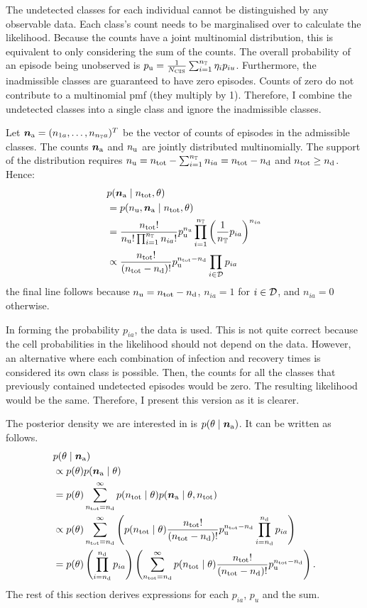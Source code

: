 \documentclass[thesis.tex]{subfiles}
\begin{document}
The undetected classes for each individual cannot be distinguished by any observable data.
Each class's count needs to be marginalised over to calculate the likelihood.
Because the counts have a joint multinomial distribution, this is equivalent to only considering the sum of the counts.
The overall probability of an episode being unobserved is $p_\text{u} = \frac{1}{N_\text{CIS}} \sum_{i=1}^{n_{\mathbb{T}}} \eta_i p_{iu}$.
Furthermore, the inadmissible classes are guaranteed to have zero episodes.
Counts of zero do not contribute to a multinomial pmf (they multiply by 1).
Therefore, I combine the undetected classes into a single class and ignore the inadmissible classes.

Let $\bm{n_\text{a}} = (n_{1a}, \dots, n_{n_{\mathbb{T}} a})^T$ be the vector of counts of episodes in the admissible classes.
The counts $\bm{n_\text{a}}$ and $n_\text{u}$ are jointly distributed multinomially.
The support of the distribution requires $n_\text{u} = n_\text{tot} - \sum_{i=1}^{n_{\mathbb{T}}} n_{ia} = n_\text{tot} - n_\text{d}$ and $n_\text{tot} \geq n_\text{d}$.
Hence:
\begin{align}
&p(\bm{n_\text{a}} \mid n_\text{tot}, \theta) \\
&= p(n_\text{u}, \bm{n_\text{a}}\mid n_\text{tot}, \theta) \\
&= \frac{n_\text{tot}!}{n_\text{u}! \prod_{i=1}^{n_{\mathbb{T}}} n_{ia}!}  p_\text{u}^{n_\text{u}}\prod_{i=1}^{n_{\mathbb{T}}} \left(\frac{1}{n_{\mathbb{T}}}p_{ia}\right)^{n_{ia}} \\
&\propto \frac{n_\text{tot}!}{(n_\text{tot} - n_\text{d})!} p_\text{u}^{n_\text{tot} - n_\text{d}} \prod_{i \in \mathcal{D}} p_{ia} \label{perf-test:eq:augmented-likelihood}
\end{align}
the final line follows because $n_\text{u} = n_\text{tot} - n_\text{d}$, $n_{ia} = 1$ for $i \in \mathcal{D}$, and $n_{ia} = 0$ otherwise.

In forming the probability $p_{ia}$, the data is used.
This is not quite correct because the cell probabilities in the likelihood should not depend on the data.
However, an alternative where each combination of infection and recovery times is considered its own class is possible.
Then, the counts for all the classes that previously contained undetected episodes would be zero.
The resulting likelihood would be the same.
Therefore, I present this version as it is clearer.

The posterior density we are interested in is $p(\theta \mid \bm{n_\text{a}})$.
It can be written as follows.
\begin{align}
&p(\theta \mid \bm{n_\text{a}}) \\
&\propto p(\theta) p(\bm{n_\text{a}} \mid \theta) \\
&= p(\theta) \sum_{n_\text{tot}=n_\text{d}}^\infty p(n_\text{tot} \mid \theta) p(\bm{n_\text{a}} \mid \theta, n_\text{tot}) \\
&\propto p(\theta) \sum_{n_\text{tot}=n_\text{d}}^\infty \left( p(n_\text{tot} \mid \theta) \frac{n_\text{tot}!}{(n_\text{tot} - n_\text{d})!} p_\text{u}^{n_\text{tot} - n_\text{d}} \prod_{i=n_\text{d}}^{n_\text{d}} p_{ia} \right) \\
&= p(\theta) \left( \prod_{i=n_\text{d}}^{n_\text{d}} p_{ia} \right) \left( \sum_{n_\text{tot}=n_\text{d}}^\infty p(n_\text{tot} \mid \theta) \frac{n_\text{tot}!}{(n_\text{tot} - n_\text{d})!} p_\text{u}^{n_\text{tot} - n_\text{d}} \right) \label{perf-test:eq:full-posterior}.
\end{align}
The rest of this section derives expressions for each $p_{ia}$, $p_{u}$ and the sum.
\end{document}
